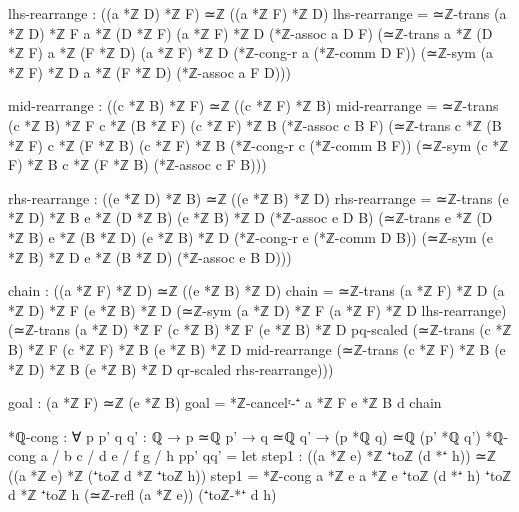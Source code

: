 \documentclass[11pt,a4paper]{book}
\begin{document}
\begin{code}
    lhs-rearrange : ((a *ℤ D) *ℤ F) ≃ℤ ((a *ℤ F) *ℤ D)
    lhs-rearrange = ≃ℤ-trans {(a *ℤ D) *ℤ F} {a *ℤ (D *ℤ F)} {(a *ℤ F) *ℤ D}
                     (*ℤ-assoc a D F)
                     (≃ℤ-trans {a *ℤ (D *ℤ F)} {a *ℤ (F *ℤ D)} {(a *ℤ F) *ℤ D}
                       (*ℤ-cong-r a (*ℤ-comm D F))
                       (≃ℤ-sym {(a *ℤ F) *ℤ D} {a *ℤ (F *ℤ D)} (*ℤ-assoc a F D)))
    
    mid-rearrange : ((c *ℤ B) *ℤ F) ≃ℤ ((c *ℤ F) *ℤ B)
    mid-rearrange = ≃ℤ-trans {(c *ℤ B) *ℤ F} {c *ℤ (B *ℤ F)} {(c *ℤ F) *ℤ B}
                     (*ℤ-assoc c B F)
                     (≃ℤ-trans {c *ℤ (B *ℤ F)} {c *ℤ (F *ℤ B)} {(c *ℤ F) *ℤ B}
                       (*ℤ-cong-r c (*ℤ-comm B F))
                       (≃ℤ-sym {(c *ℤ F) *ℤ B} {c *ℤ (F *ℤ B)} (*ℤ-assoc c F B)))
    
    rhs-rearrange : ((e *ℤ D) *ℤ B) ≃ℤ ((e *ℤ B) *ℤ D)
    rhs-rearrange = ≃ℤ-trans {(e *ℤ D) *ℤ B} {e *ℤ (D *ℤ B)} {(e *ℤ B) *ℤ D}
                     (*ℤ-assoc e D B)
                     (≃ℤ-trans {e *ℤ (D *ℤ B)} {e *ℤ (B *ℤ D)} {(e *ℤ B) *ℤ D}
                       (*ℤ-cong-r e (*ℤ-comm D B))
                       (≃ℤ-sym {(e *ℤ B) *ℤ D} {e *ℤ (B *ℤ D)} (*ℤ-assoc e B D)))
    
    chain : ((a *ℤ F) *ℤ D) ≃ℤ ((e *ℤ B) *ℤ D)
    chain = ≃ℤ-trans {(a *ℤ F) *ℤ D} {(a *ℤ D) *ℤ F} {(e *ℤ B) *ℤ D}
              (≃ℤ-sym {(a *ℤ D) *ℤ F} {(a *ℤ F) *ℤ D} lhs-rearrange)
              (≃ℤ-trans {(a *ℤ D) *ℤ F} {(c *ℤ B) *ℤ F} {(e *ℤ B) *ℤ D}
                pq-scaled
                (≃ℤ-trans {(c *ℤ B) *ℤ F} {(c *ℤ F) *ℤ B} {(e *ℤ B) *ℤ D}
                  mid-rearrange
                  (≃ℤ-trans {(c *ℤ F) *ℤ B} {(e *ℤ D) *ℤ B} {(e *ℤ B) *ℤ D}
                    qr-scaled rhs-rearrange)))
    
    goal : (a *ℤ F) ≃ℤ (e *ℤ B)
    goal = *ℤ-cancelʳ-⁺ {a *ℤ F} {e *ℤ B} d chain

*ℚ-cong : ∀ {p p' q q' : ℚ} → p ≃ℚ p' → q ≃ℚ q' → (p *ℚ q) ≃ℚ (p' *ℚ q')
*ℚ-cong {a / b} {c / d} {e / f} {g / h} pp' qq' =
  let 
    step1 : ((a *ℤ e) *ℤ ⁺toℤ (d *⁺ h)) ≃ℤ ((a *ℤ e) *ℤ (⁺toℤ d *ℤ ⁺toℤ h))
    step1 = *ℤ-cong {a *ℤ e} {a *ℤ e} {⁺toℤ (d *⁺ h)} {⁺toℤ d *ℤ ⁺toℤ h}
                    (≃ℤ-refl (a *ℤ e)) (⁺toℤ-*⁺ d h)
    

\end{code}
\end{document}
